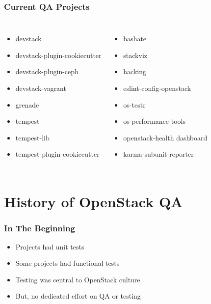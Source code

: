 \documentclass[aspectratio=43,11pt,hyperref={colorlinks=true}]{beamer}
\begin{document}
\begin{frame}
    \frametitle{Current QA Projects}
    \begin{columns}
            \begin{itemize}
                \item{devstack}
                \item{devstack-plugin-cookiecutter}
                \item{devstack-plugin-ceph}
                \item{devstack-vagrant}
                \item{grenade}
                \item{tempest}
                \item{tempest-lib}
                \item{tempest-plugin-cookiecutter}
            \end{itemize}
            \begin{itemize}
                \item{bashate}
                \item{stackviz}
                \item{hacking}
                \item{eslint-config-openstack}
                \item{os-testr}
                \item{os-performance-tools}
                \item{openstack-health dashboard}
                \item{karma-subunit-reporter}
            \end{itemize}
    \end{columns}
\end{frame}

\section{History of OpenStack QA}

\begin{frame}
    \frametitle{In The Beginning}
    \begin{itemize}
    \item Projects had unit tests
    \item Some projects had functional tests
    \item Testing was central to OpenStack culture
    \item But, no dedicated effort on QA or testing
    \end{itemize}
\end{frame}
\end{document}
